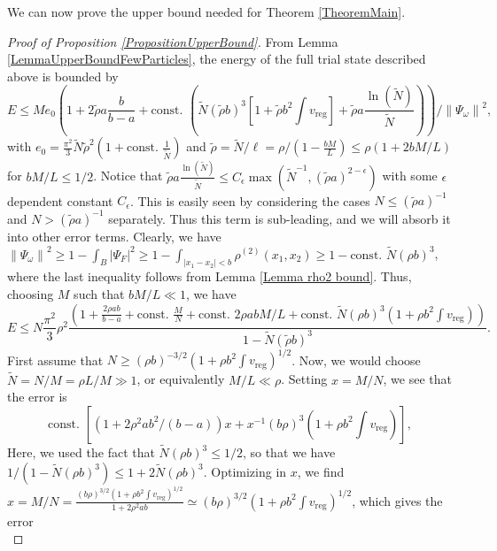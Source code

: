 \documentclass[a4paper,11pt]{article}
\newcommand{\norm}[1]{\left\lVert #1 \right\rVert}
\newcommand{\abs}[1]{\left\lvert #1 \right\rvert}
\numberwithin{equation}{section}
\begin{document}
We can now prove the upper bound needed for Theorem \ref{TheoremMain}. 
	\begin{proof}[Proof of Proposition \ref{PropositionUpperBound}]
	From Lemma \ref{LemmaUpperBoundFewParticles}, the energy of the full trial state described above is bounded by \begin{equation}\label{EqUpperBoundSmallN}
	E\leq M e_0\left(1+2\tilde{\rho} a\frac{b}{b-a} + \text{const. } \left(\tilde{N} (\tilde{\rho}b)^3\left[1+\tilde{\rho} b^2\int v_{\text{reg}}\right]+\tilde{\rho} a \frac{\ln(\tilde{N})}{\tilde{N}}\right)\right)/\norm{\Psi_\omega}^2,
	\end{equation}
	with $ e_0=\frac{\pi^2}{3}\tilde{N}\tilde{\rho}^2(1+\text{const. }\frac{1}{\tilde{N}}) $ and $ \tilde{\rho}=\tilde{N}/\ell=\rho/(1-\frac{bM}{L})\leq \rho(1+2bM/L) $ for $ bM/L\leq 1/2 $. Notice that $\tilde{\rho} a \frac{\ln(\tilde{N})}{\tilde{N}}\leq  C_\epsilon\max (\tilde{N}^{-1},(\tilde{\rho} a)^{2-\epsilon} )$ with some $\epsilon$ dependent constant $C_\epsilon$. This is easily seen by considering the cases $N\leq(\tilde\rho a)^{-1}$ and $N>(\tilde\rho a)^{-1}$ separately. Thus this term is sub-leading, and we will absorb it into other error terms.
 Clearly, we have $ \norm{\Psi_\omega}^2\geq 1-\int_B\abs{\Psi_F}^2\geq 1-\int_{\abs{x_1-x_2}<b}\rho^{(2)}(x_1,x_2)\geq 1-\text{const. }\tilde{N}(\rho b)^3 $, where the last inequality follows from Lemma \ref{Lemma rho2 bound}.
	Thus, choosing $ M $ such that $ bM/L\ll 1 $, we have \begin{equation}
	E\leq N\frac{\pi^2}{3}\rho^2\frac{\left(1+\frac{2\rho ab}{b-a}+\text{const. }\frac{M}{N}+\text{const. }2\rho abM/L+\text{const. }\tilde{N}(\rho b)^3\left(1+\rho b^2\int v_{\text{reg}}\right)\right)}{1-\tilde{N}(\tilde{\rho} b)^3}.
	\end{equation}
	First assume that $ N\geq (\rho b)^{-3/2}\left(1+\rho b^2\int v_{\text{reg}}\right)^{1/2} $. Now, we would choose $ \tilde{N}=N/M=\rho L/M\gg 1 $, or equivalently $ M/L\ll \rho $. Setting $ x=M/N $, we see that the error is \begin{equation}
	\text{const. }\left[(1+2\rho^2 ab^2/(b-a))x+x^{-1}(b\rho)^3\left(1+\rho b^2\int v_{\text{reg}}\right)\right],
	\end{equation}
	Here, we used the fact that $ \tilde{N}(\rho b)^3\leq 1/2 $, so that we have\\ $ 1/(1-\tilde{N}(\rho b)^3)\leq 1+2\tilde{N}(\rho b)^3 $.
	Optimizing in $ x $, we find $ x=M/N=\frac{(b\rho)^{3/2}\left(1+\rho b^2\int v_{\text{reg}}\right)^{1/2}}{1+2\rho^2 a b}\simeq(b\rho)^{3/2}\left(1+\rho b^2\int v_{\text{reg}}\right)^{1/2} $, which gives the error \begin{equation}

\end{equation}
\end{proof}
\end{document}
